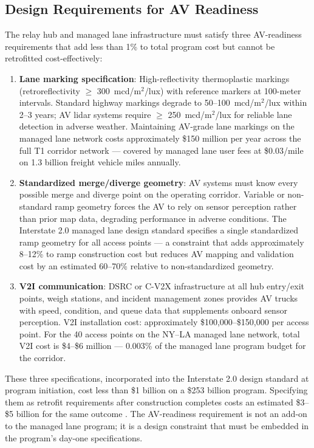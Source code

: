 \subsection{Design Requirements for AV Readiness}

The relay hub and managed lane infrastructure must satisfy three AV-readiness requirements
that add less than 1\% to total program cost but cannot be retrofitted cost-effectively:

\begin{enumerate}
  \item \textbf{Lane marking specification}: High-reflectivity thermoplastic markings
  (retroreflectivity $\geq$ 300~mcd/m$^2$/lux) with reference markers at 100-meter intervals.
  Standard highway markings degrade to 50--100~mcd/m$^2$/lux within 2--3 years; AV lidar
  systems require $\geq$ 250~mcd/m$^2$/lux for reliable lane detection in adverse weather.
  Maintaining AV-grade lane markings on the managed lane network costs approximately
  \$150 million per year across the full T1 corridor network --- covered by managed lane
  user fees at \$0.03/mile on 1.3 billion freight vehicle miles annually.

  \item \textbf{Standardized merge/diverge geometry}: AV systems must know every possible
  merge and diverge point on the operating corridor. Variable or non-standard ramp geometry
  forces the AV to rely on sensor perception rather than prior map data, degrading performance
  in adverse conditions. The Interstate 2.0 managed lane design standard specifies a
  single standardized ramp geometry for all access points --- a constraint that adds
  approximately 8--12\% to ramp construction cost but reduces AV mapping and validation
  cost by an estimated 60--70\% relative to non-standardized geometry.

  \item \textbf{V2I communication}: DSRC or C-V2X infrastructure at all hub entry/exit points,
  weigh stations, and incident management zones provides AV trucks with speed, condition,
  and queue data that supplements onboard sensor perception. V2I installation cost:
  approximately \$100,000--\$150,000 per access point. For the 40 access points on the NY--LA
  managed lane network, total V2I cost is \$4--\$6 million --- 0.003\% of the managed lane
  program budget for the corridor.
\end{enumerate}

These three specifications, incorporated into the Interstate 2.0 design standard at program
initiation, cost less than \$1 billion on a \$253 billion program. Specifying them as retrofit
requirements after construction completes costs an estimated \$3--\$5 billion for the same
outcome \citep{ROUTE_E2}. The AV-readiness requirement is not an add-on to the managed lane
program; it is a design constraint that must be embedded in the program's day-one specifications.
